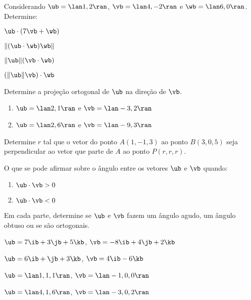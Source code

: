 \item Considerando $\ub=\lan 1,2\ran$, $\vb=\lan 4,-2\ran$ e $\wb=\lan 6,0\ran$. Determine:
    \begin{enumerate}[leftmargin=*]
        \begin{multicols}{2}
        \item $\ub\cdot(7\vb+\wb)$
        \item $\|(\ub\cdot\wb)\wb\|$
        \item $\|\ub\|(\vb\cdot\wb)$
        \item $(\|\ub\|\vb)\cdot\wb$
        \end{multicols}
    \end{enumerate}
\item Determine a projeção ortogonal de $\ub$ na direção de $\vb$.
    \begin{enumerate}[leftmargin=*]
        \item $\ub=\lan 2,1\ran$ e $\vb=\lan -3,2\ran$
        \item  $\ub=\lan 2,6\ran$ e $\vb=\lan -9,3\ran$
    \end{enumerate}
\item Determine $r$ tal que o vetor do ponto $A(1, -1, 3)$ ao ponto
$B(3, 0, 5)$ seja perpendicular ao vetor que parte de $A$ ao ponto $P(r, r, r)$.
\item O que se pode afirmar sobre o ângulo entre os vetores $\ub$ e $\vb$ quando:
    \begin{enumerate}[leftmargin=*]
        \item $\ub\cdot\vb>0$
        \item $\ub\cdot\vb<0$
    \end{enumerate}

\item Em cada parte, determine se $\ub$ e $\vb$ fazem um ângulo agudo, um ângulo obtuso ou se são ortogonais.
    \begin{enumerate}[leftmargin=*]
        \begin{multicols}{2}
        \item $\ub = 7\ib + 3\jb + 5\kb$, $\vb = -8\ib + 4\jb + 2\kb$
        \item $\ub = 6\ib + \jb + 3\kb$, $\vb = 4\ib - 6\kb$
        \item $\ub = \lan1, 1, 1\ran$, $\vb = \lan-1, 0, 0\ran$
        \item $\ub = \lan 4, 1, 6\ran$, $\vb = \lan -3, 0, 2\ran$
        \end{multicols}
    \end{enumerate}

